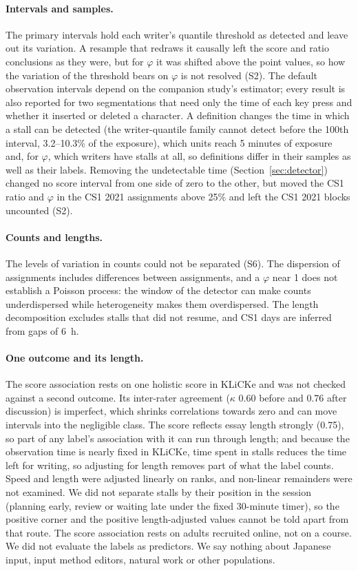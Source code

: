 \paragraph{Intervals and samples.} The primary intervals hold each writer's quantile threshold as detected and leave
out its variation. A resample that redraws it causally left the score and ratio conclusions as they were, but for
$\varphi$ it was shifted above the point values, so how the variation of the threshold bears on $\varphi$ is not
resolved (S2). The default observation intervals depend on the companion study's estimator; every result is also
reported for two segmentations that need only the time of each key press and whether it inserted or deleted a
character.
A definition changes the time in which a stall can be detected (the writer-quantile family
cannot detect before the 100th interval, 3.2--10.3\% of the exposure), which units reach 5 minutes of exposure and, for $\varphi$, which writers
have stalls at all, so definitions differ in their samples as well as their labels. Removing the undetectable time (Section~\ref{sec:detector})
changed no score interval from one side of zero to the other, but moved the CS1 ratio and $\varphi$ in the CS1 2021
assignments above 25\% and left the CS1 2021 blocks uncounted (S2).

\paragraph{Counts and lengths.} The levels of variation in counts could not be separated (S6). The dispersion of
assignments includes differences between assignments, and a $\varphi$ near 1 does not establish a Poisson process: the
window of the detector can make counts underdispersed while heterogeneity makes them overdispersed. The length
decomposition excludes stalls that did not resume, and CS1 days are inferred from gaps of 6~h.

\paragraph{One outcome and its length.} The score association rests on one holistic score in KLiCKe and was not checked
against a second outcome. Its inter-rater agreement ($\kappa$ 0.60 before and 0.76 after discussion) is imperfect, which shrinks
correlations towards zero and can move intervals into the negligible class. The score reflects essay length strongly (0.75), so part of any label's association with it
can run through length; and because the observation time is nearly fixed in KLiCKe, time spent in stalls reduces the
time left for writing, so adjusting for length removes part of what the label counts. Speed and length were adjusted linearly on ranks, and non-linear remainders were not examined.
We did not separate stalls by their position in the session (planning early, review or waiting late under the
fixed 30-minute timer), so the positive corner and the positive length-adjusted values cannot be told apart from that
route. The score association rests on adults recruited online, not on a course. We did not evaluate the labels as
predictors. We say nothing about Japanese input, input method editors, natural work
or other populations.
